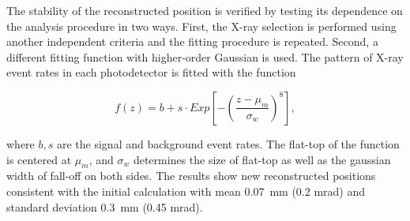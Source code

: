 The stability of the reconstructed position 
is verified by testing its dependence on 
the analysis procedure in two ways. 
First, the X-ray selection is performed using another independent criteria
and the fitting procedure is repeated.
Second, a different fitting function with higher-order Gaussian is
used. The pattern of X-ray event rates in each photodetector is fitted with
the function

\begin{equation} \label{eqn:supergauss}
    f(z)=b+s\cdot
Exp\left[-\left(\frac{z-\mu_{m}}{\sigma_{w}}\right)^{8}\right],
\end{equation}

where $b,s$ are the signal and background event rates. The 
flat-top of the function is centered at $\mu_m$,
and $\sigma_w$ determines the size  of
flat-top as well as the gaussian width of fall-off
on both sides. 
The results show new reconstructed positions consistent with the initial
calculation with mean 0.07~mm (0.2 mrad) and standard deviation
0.3~mm (0.45 mrad).


